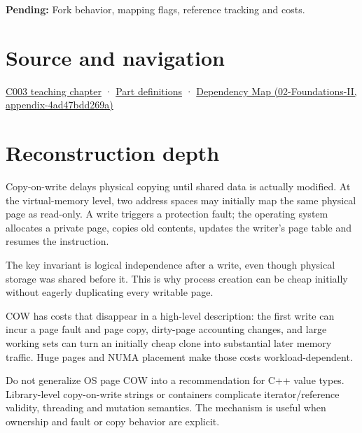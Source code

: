 \textbf{Pending:} Fork behavior, mapping flags, reference tracking and costs.

\section{Source and navigation}\label{appendix-7a06e5baac04-source-and-navigation}

\href{Continuous\%20Notes/Computing\%20Foundations\%20-\%20From\%20Bits\%20to\%20C++\%20and\%20Systems\%20APIs\#Where\%20the\%20bytes\%20live}{C003 teaching chapter} · \hyperref[appendix-fd090d982a15-m003---parts-41-60]{Part definitions} · \href{../02-Foundations-II/main.pdf\#nameddest=appendix-4ad47bdd269a}{Dependency Map (02-Foundations-II, appendix-4ad47bdd269a)}

\section{Reconstruction depth}\label{appendix-7a06e5baac04-reconstruction-depth}

Copy-on-write delays physical copying until shared data is actually modified. At the virtual-memory level, two address spaces may initially map the same physical page as read-only. A write triggers a protection fault; the operating system allocates a private page, copies old contents, updates the writer's page table and resumes the instruction.

The key invariant is logical independence after a write, even though physical storage was shared before it. This is why process creation can be cheap initially without eagerly duplicating every writable page.

COW has costs that disappear in a high-level description: the first write can incur a page fault and page copy, dirty-page accounting changes, and large working sets can turn an initially cheap clone into substantial later memory traffic. Huge pages and NUMA placement make those costs workload-dependent.

Do not generalize OS page COW into a recommendation for C++ value types. Library-level copy-on-write strings or containers complicate iterator/reference validity, threading and mutation semantics. The mechanism is useful when ownership and fault or copy behavior are explicit.
